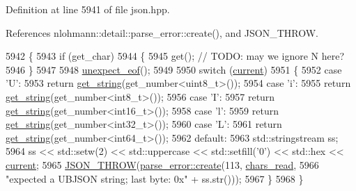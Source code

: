 Definition at line 5941 of file json.\+hpp.



References nlohmann\+::detail\+::parse\+\_\+error\+::create(), and J\+S\+O\+N\+\_\+\+T\+H\+R\+OW.


\begin{DoxyCode}
5942     \{
5943         \textcolor{keywordflow}{if} (get\_char)
5944         \{
5945             \textcolor{keyword}{get}();  \textcolor{comment}{// TODO: may we ignore N here?}
5946         \}
5947 
5948         \hyperlink{classnlohmann_1_1detail_1_1binary__reader_a1dfc55484af3a896c376b41cd99f3e15}{unexpect\_eof}();
5949 
5950         \textcolor{keywordflow}{switch} (\hyperlink{classnlohmann_1_1detail_1_1binary__reader_a7e994e201b215cd6d6ae28a1853f43e0}{current})
5951         \{
5952             \textcolor{keywordflow}{case} \textcolor{charliteral}{'U'}:
5953                 \textcolor{keywordflow}{return} \hyperlink{classnlohmann_1_1detail_1_1binary__reader_a195b573a807da6d5841a898c6f74e03c}{get\_string}(get\_number<uint8\_t>());
5954             \textcolor{keywordflow}{case} \textcolor{charliteral}{'i'}:
5955                 \textcolor{keywordflow}{return} \hyperlink{classnlohmann_1_1detail_1_1binary__reader_a195b573a807da6d5841a898c6f74e03c}{get\_string}(get\_number<int8\_t>());
5956             \textcolor{keywordflow}{case} \textcolor{charliteral}{'I'}:
5957                 \textcolor{keywordflow}{return} \hyperlink{classnlohmann_1_1detail_1_1binary__reader_a195b573a807da6d5841a898c6f74e03c}{get\_string}(get\_number<int16\_t>());
5958             \textcolor{keywordflow}{case} \textcolor{charliteral}{'l'}:
5959                 \textcolor{keywordflow}{return} \hyperlink{classnlohmann_1_1detail_1_1binary__reader_a195b573a807da6d5841a898c6f74e03c}{get\_string}(get\_number<int32\_t>());
5960             \textcolor{keywordflow}{case} \textcolor{charliteral}{'L'}:
5961                 \textcolor{keywordflow}{return} \hyperlink{classnlohmann_1_1detail_1_1binary__reader_a195b573a807da6d5841a898c6f74e03c}{get\_string}(get\_number<int64\_t>());
5962             \textcolor{keywordflow}{default}:
5963                 std::stringstream ss;
5964                 ss << std::setw(2) << std::uppercase << std::setfill(\textcolor{charliteral}{'0'}) << std::hex << 
      \hyperlink{classnlohmann_1_1detail_1_1binary__reader_a7e994e201b215cd6d6ae28a1853f43e0}{current};
5965                 \hyperlink{json_8hpp_a6c274f6db2e65c1b66c7d41b06ad690f}{JSON\_THROW}(\hyperlink{classnlohmann_1_1detail_1_1parse__error_a9fd60ad6bce80fd99686ad332faefd37}{parse\_error::create}(113, 
      \hyperlink{classnlohmann_1_1detail_1_1binary__reader_a2dbde0b7390100efe0bfc54e21c3a34b}{chars\_read},
5966                                                \textcolor{stringliteral}{"expected a UBJSON string; last byte: 0x"} + ss.str()));
5967         \}
5968     \}
\end{DoxyCode}
